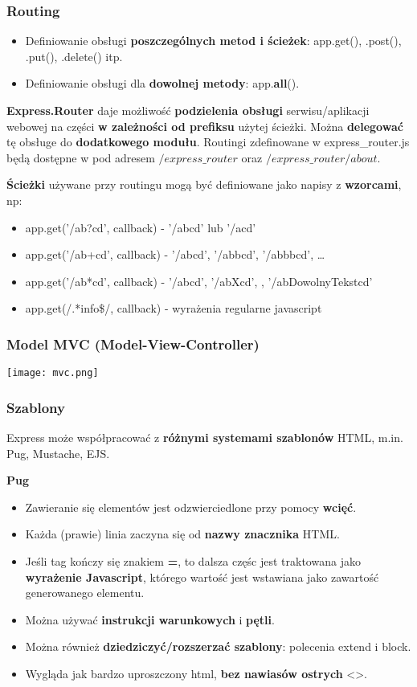 \documentclass[../main.tex]{subfiles}
\begin{document}
    \subsubsection{Routing}
    \begin{itemize}
        \item Definiowanie obsługi \textbf{poszczególnych metod i ścieżek}: app.get(), .post(), .put(), .delete() itp.
        \item Definiowanie obsługi dla \textbf{dowolnej metody}: app.\textbf{all}().
    \end{itemize}

    \textbf{Express.Router} daje możliwość \textbf{podzielenia obsługi} serwisu/aplikacji webowej na części \textbf{w
    zależności od prefiksu} użytej ścieżki. Można \textbf{delegować} tę obsługe do \textbf{dodatkowego modułu}. Routingi
    zdefinowane w express\_router.js będą dostępne w pod adresem $/express\_router$ oraz $/express\_router/about$.

    \textbf{Ścieżki} używane przy routingu mogą być definiowane jako napisy z \textbf{wzorcami}, np:
    \begin{itemize}
        \item app.get('/ab?cd', callback) - '/abcd' lub '/acd'
        \item app.get('/ab+cd', callback) - '/abcd', '/abbcd', '/abbbcd', \dots
        \item app.get('/ab*cd', callback) - '/abcd', '/abXcd', , '/abDowolnyTekstcd'
        \item app.get(/.*info\$/, callback) - wyrażenia regularne javascript
    \end{itemize}

    \subsubsection{Model MVC (Model-View-Controller)}
    \texttt{[image: mvc.png]}

    \subsubsection{Szablony}
    Express może współpracować z \textbf{różnymi systemami szablonów} HTML, m.in. Pug, Mustache, EJS.

    \textbf{Pug}
    \begin{itemize}
        \item Zawieranie się elementów jest odzwierciedlone przy pomocy \textbf{wcięć}.
        \item Każda (prawie) linia zaczyna się od \textbf{nazwy znacznika} HTML.
        \item Jeśli tag kończy się znakiem \textbf{=}, to dalsza częśc jest traktowana jako \textbf{wyrażenie Javascript}, którego wartość jest wstawiana jako zawartość generowanego elementu.
        \item Można używać \textbf{instrukcji warunkowych} i \textbf{pętli}.
        \item Można również \textbf{dziedziczyć/rozszerzać szablony}: polecenia extend i block.
        \item Wygląda jak bardzo uproszczony html, \textbf{bez nawiasów ostrych} <>.
    \end{itemize}
\end{document}
